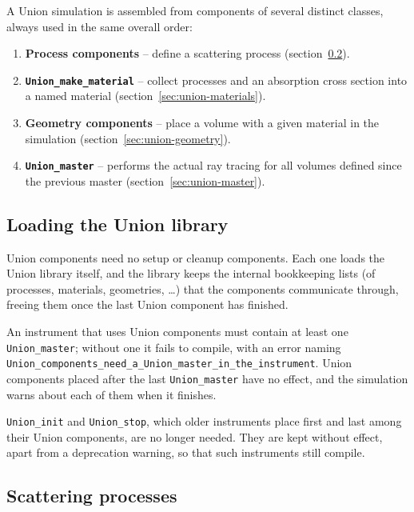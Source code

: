 A Union simulation is assembled from components of several distinct
classes, always used in the same overall order:

\begin{enumerate}
\item \textbf{Process components} -- define a scattering process
  (section~\ref{sec:union-processes}).
\item \textbf{\texttt{Union\_make\_material}} -- collect processes and an
  absorption cross section into a named material
  (section~\ref{sec:union-materials}).
\item \textbf{Geometry components} -- place a volume with a given material
  in the simulation (section~\ref{sec:union-geometry}).
\item \textbf{\texttt{Union\_master}} -- performs the actual ray tracing
  for all volumes defined since the previous master
  (section~\ref{sec:union-master}).
\end{enumerate}

\subsection{Loading the Union library}
\label{sec:union-library}

Union components need no setup or cleanup components. Each one loads the
Union library itself, and the library keeps the internal bookkeeping lists
(of processes, materials, geometries, \ldots) that the components communicate through, freeing them once
the last Union component has finished.

An instrument that uses Union components must contain at least one
\texttt{Union\_master}; without one it fails to compile, with an error
naming \texttt{Union\_components\_need\_a\_Union\_master\_in\_the\_instrument}.
Union components placed after the last \texttt{Union\_master} have no
effect, and the simulation warns about each of them when it finishes.

\texttt{Union\_init} and \texttt{Union\_stop}, which older instruments
place first and last among their Union components, are no longer needed.
They are kept without effect, apart from a deprecation warning, so that such
instruments still compile.

\subsection{Scattering processes}
\label{sec:union-processes}

